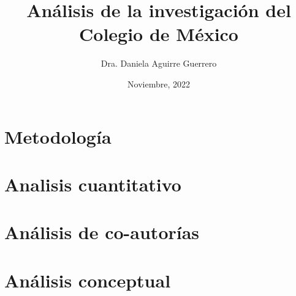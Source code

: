\documentclass[kulak]{kulakarticle} %
\title{Análisis de la investigación del Colegio de México}
\author{Dra. Daniela Aguirre Guerrero}
\date{Noviembre, 2022}
\begin{document}
\maketitle

\section{Metodología}


\section{Analisis cuantitativo}

\newpage
\section{Análisis de co-autorías}


\section{Análisis conceptual}





\end{document}
